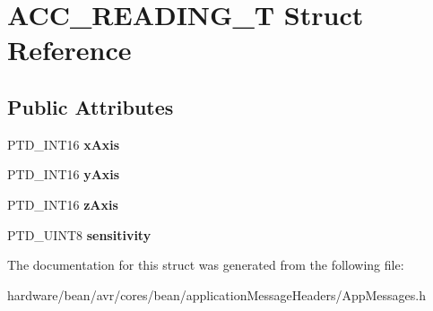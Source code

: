 \hypertarget{struct_a_c_c___r_e_a_d_i_n_g___t}{}\section{A\+C\+C\+\_\+\+R\+E\+A\+D\+I\+N\+G\+\_\+T Struct Reference}
\label{struct_a_c_c___r_e_a_d_i_n_g___t}
\subsection*{Public Attributes}
\begin{DoxyCompactItemize}
\item 
P\+T\+D\+\_\+\+I\+N\+T16 {\bfseries x\+Axis}\hypertarget{struct_a_c_c___r_e_a_d_i_n_g___t_afd4a389ac161d7dd67a0f5955368df39}{}\label{struct_a_c_c___r_e_a_d_i_n_g___t_afd4a389ac161d7dd67a0f5955368df39}

\item 
P\+T\+D\+\_\+\+I\+N\+T16 {\bfseries y\+Axis}\hypertarget{struct_a_c_c___r_e_a_d_i_n_g___t_ac816a3b3d0e12c83458c8a5b5dbfaf90}{}\label{struct_a_c_c___r_e_a_d_i_n_g___t_ac816a3b3d0e12c83458c8a5b5dbfaf90}

\item 
P\+T\+D\+\_\+\+I\+N\+T16 {\bfseries z\+Axis}\hypertarget{struct_a_c_c___r_e_a_d_i_n_g___t_ac7b2fe087dbbf046ce51893a032c662e}{}\label{struct_a_c_c___r_e_a_d_i_n_g___t_ac7b2fe087dbbf046ce51893a032c662e}

\item 
P\+T\+D\+\_\+\+U\+I\+N\+T8 {\bfseries sensitivity}\hypertarget{struct_a_c_c___r_e_a_d_i_n_g___t_a26626c8cd8cbebee04c55efb32ac357e}{}\label{struct_a_c_c___r_e_a_d_i_n_g___t_a26626c8cd8cbebee04c55efb32ac357e}

\end{DoxyCompactItemize}


The documentation for this struct was generated from the following file\+:\begin{DoxyCompactItemize}
\item 
hardware/bean/avr/cores/bean/application\+Message\+Headers/App\+Messages.\+h\end{DoxyCompactItemize}
